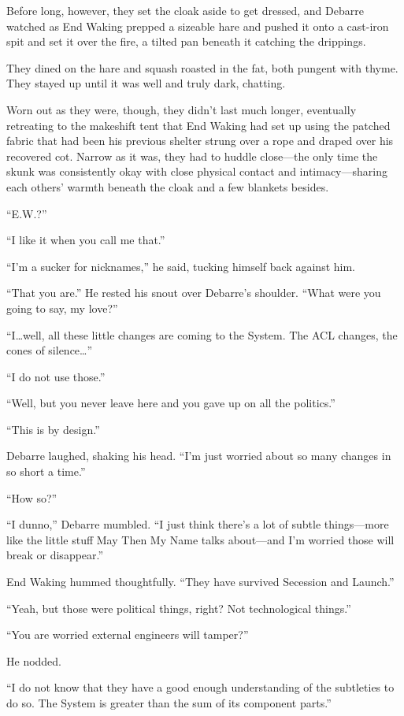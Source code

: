 Before long, however, they set the cloak aside to get dressed, and Debarre watched as End Waking prepped a sizeable hare and pushed it onto a cast-iron spit and set it over the fire, a tilted pan beneath it catching the drippings.

They dined on the hare and squash roasted in the fat, both pungent with thyme. They stayed up until it was well and truly dark, chatting.

Worn out as they were, though, they didn't last much longer, eventually retreating to the makeshift tent that End Waking had set up using the patched fabric that had been his previous shelter strung over a rope and draped over his recovered cot. Narrow as it was, they had to huddle close—the only time the skunk was consistently okay with close physical contact and intimacy—sharing each others' warmth beneath the cloak and a few blankets besides.

``E.W.?''

``I like it when you call me that.''

``I'm a sucker for nicknames,'' he said, tucking himself back against him.

``That you are.'' He rested his snout over Debarre's shoulder. ``What were you going to say, my love?''

``I\ldots well, all these little changes are coming to the System. The ACL changes, the cones of silence\ldots{}''

``I do not use those.''

``Well, but you never leave here and you gave up on all the politics.''

``This is by design.''

Debarre laughed, shaking his head. ``I'm just worried about so many changes in so short a time.''

``How so?''

``I dunno,'' Debarre mumbled. ``I just think there's a lot of subtle things—more like the little stuff May Then My Name talks about—and I'm worried those will break or disappear.''

End Waking hummed thoughtfully. ``They have survived Secession and Launch.''

``Yeah, but those were political things, right? Not technological things.''

``You are worried external engineers will tamper?''

He nodded.

``I do not know that they have a good enough understanding of the subtleties to do so. The System is greater than the sum of its component parts.''

